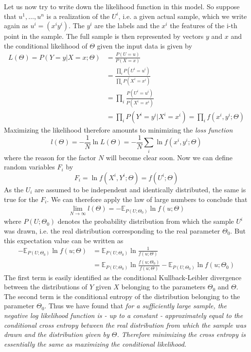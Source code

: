 \documentclass[a4paper, draft]{report}
\numberwithin{section}{chapter}
\numberwithin{equation}{chapter}
\theoremstyle{own}
\theoremstyle{remark}
\begin{document}
Let us now try to write down the likelihood function in this model. So suppose that $u^1, \dots, u^n$ is a realization of the $U^i$, i.e. a given actual sample, which we write again as $u^i = (x^i y^i)$. The $y^i$ are the labels and the $x^i$ the features of the i-th point in the sample. The full sample is then represented by vectors $y$ and $x$ and the conditional likelihood of $\Theta$ given the input data is given by
\begin{align*}
L(\Theta) = P(Y =y | X = x ; \Theta) &= \frac{P(U = u)}{P(X =x)} \\
&= \frac{\prod_i P(U^i = u^i)}{\prod_i P(X^i = x^i)} \\ 
&= \prod_i \frac{P(U^i = u^i)}{P(X^i = x^i)} \\
&= \prod_i P(Y^i = y^i | X^i = x^i) = \prod_i f(x^i,y^i;\Theta)
\end{align*}
Maximizing the likelihood therefore amounts to minimizing the {\em loss function}
$$
l(\Theta) = - \frac{1}{N} \ln L(\Theta) = - \frac{1}{N} \sum_i \ln f(x^i,y^i ; \Theta)  
$$
where the reason for the factor $N$ will become clear soon. Now we can define random variables $F_i$ by
$$
F_i = \ln f(X^i, Y^i ; \Theta) = f(U^i ; \Theta)
$$
As the $U_i$ are assumed to be independent and identically distributed, the same is true for the $F_i$. We can therefore apply the law of large numbers to conclude that 
\begin{align}\label{eq:expectationvaluelossdistribution}
\lim_{N \rightarrow \infty} l(\Theta) = - {\mathbb{E}_{P(U;\Theta_0)}} \ln f(u;\Theta) 
\end{align}
where $P(U;\Theta_0)$ denotes the probability distribution from which the sample $U^i$ was drawn, i.e. the real distribution corresponding to the real parameter $\Theta_0$. But this expectation value can be written as
\begin{align*}
- {\mathbb{E}_{P(U;\Theta_0)}} \ln f(u;\Theta)  &=  {\mathbb{E}_{P(U;\Theta_0)}} \ln \frac{1}{ f(u;\Theta)} \\
&=  {\mathbb{E}_{P(U;\Theta_0)}} \ln  \frac{f(u;\Theta_0)}{f(u;\Theta)} - {\mathbb{E}_{P(U;\Theta_0)}} \ln f(u;\Theta_0)
\end{align*}
The first term is easily identified as the conditional Kullback-Leibler divergence between the distributions of $Y$ given $X$ belonging to the parameters $\Theta_0$ and $\Theta$. The second term is the conditional entropy of the distribution belonging to the parameter $\Theta_0$. Thus we have found that {\em for a sufficiently large sample, the negative log likelihood function is - up to a constant - approximately equal to the conditional cross entropy between the real distribution from which the sample was drawn and the distribution given by $\Theta$.  Therefore minimizing the cross entropy is essentially the same as maximizing the conditional likelihood. }
\end{document}
